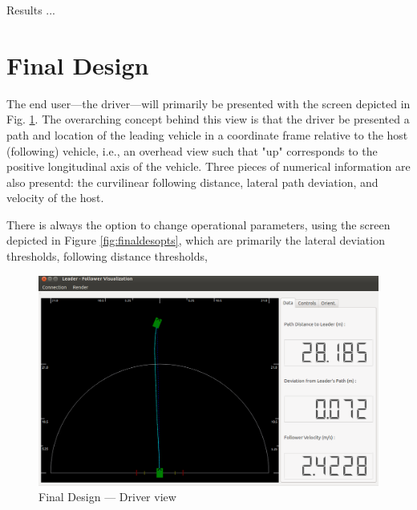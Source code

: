 \documentclass[12pt]{report}
\begin{document}
Results ...

\section{Final Design}
\label{sec:finaldes}

The end user---the driver---will primarily be presented with the screen depicted in Fig. \ref{fig:finaldesdriv}. The overarching concept behind this view is that the driver be presented a path and location of the leading vehicle in a coordinate frame relative to the host (following) vehicle, i.e., an overhead view such that "up" corresponds to the positive longitudinal axis of the vehicle. Three pieces of numerical information are also presentd: the curvilinear following distance, lateral path deviation, and velocity of the host. 

There is always the option to change operational parameters, using the screen depicted in Figure \ref{fig:finaldesopts}, which are primarily the lateral deviation thresholds, following distance thresholds, 

\begin{figure}[htbp]
    \centering
    \includegraphics[width=6.5in]{./figs/final_design_data.png}
    \caption{Final Design --- Driver view}
    \label{fig:finaldesdriv}
\end{figure}
\end{document}
